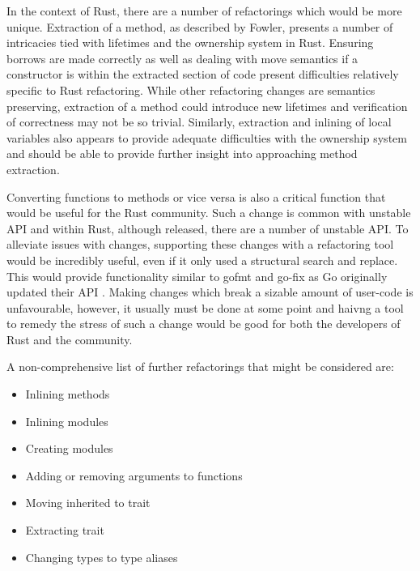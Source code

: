 In the context of Rust, there are a number of refactorings which would be more unique. Extraction of a method, as described by Fowler, presents a number of intricacies tied with lifetimes and the ownership system in Rust. Ensuring borrows are made correctly as well as dealing with move semantics if a constructor is within the extracted section of code present difficulties relatively specific to Rust refactoring. While other refactoring changes are semantics preserving, extraction of a method could introduce new lifetimes and verification of correctness may not be so trivial. Similarly, extraction and inlining of local variables also appears to provide adequate difficulties with the ownership system and should be able to provide further insight into approaching method extraction.



Converting functions to methods or vice versa is also a critical function that would be useful for the Rust community. Such a change is common with unstable API and within Rust, although released, there are a number of unstable API. To alleviate issues with changes, supporting these changes with a refactoring tool would be incredibly useful, even if it only used a structural search and replace. This would provide functionality similar to gofmt and go-fix as Go originally updated their API \cite{gofix11}. Making changes which break a sizable amount of user-code is unfavourable, however, it usually must be done at some point and haivng a tool to remedy the stress of such a change would be good for both the developers of Rust and the community.

\noindent
A non-comprehensive list of further refactorings that might be considered are:
\begin{itemize}
\item Inlining methods
\item Inlining modules
\item Creating modules
\item Adding or removing arguments to functions
\item Moving inherited to trait
\item Extracting trait
\item Changing types to type aliases
\end{itemize}

